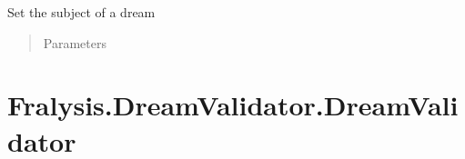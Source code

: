 \documentclass[letterpaper,10pt,english]{sphinxmanual}
\begin{document}
\begin{fulllineitems}
\begin{fulllineitems}
\begin{quote}
\begin{description}
\end{description}\end{quote}

\end{fulllineitems}


\begin{fulllineitems}
\label{\detokenize{index:Fralysis.Dream.Dream.set_subject}}
Set the subject of a dream
\begin{quote}\begin{description}
\item[{Parameters}] \leavevmode
{} \textendash{} 

\end{description}\end{quote}

\end{fulllineitems}


\end{fulllineitems}



\chapter{Fralysis.DreamValidator.DreamValidator}
\label{\detokenize{index:fralysis-dreamvalidator-dreamvalidator}}
\end{document}
